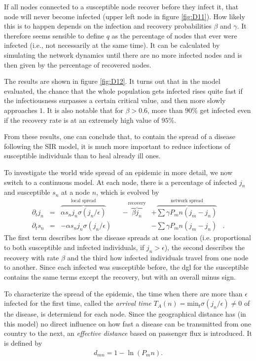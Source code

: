 \documentclass{scrartcl}
\begin{document}
If all nodes connected to a susceptible node recover before they infect it, that node will never become infected (upper left node in figure \ref{fig:D11}). How likely this is to happen depends on the infection and recovery probabilities $\beta$ and $\gamma$. 
It therefore seems sensible to define $q$ as the percentage of nodes that ever were infected (i.e., not necessarily at the same time). 
It can be calculated by simulating the network dynamics until there are no more infected nodes and is then given by the percentage of recovered nodes. 

The results are shown in figure \ref{fig:D12}. 
It turns out that in the model evaluated, the chance that the whole 
population gets infected rises quite fast if the infectiousness surpasses
a certain critical value, and then more slowly approaches $1$. It is also 
notable that for $\beta > 0.6$, more than $90\%$ get infected even if
the recovery rate is at an extremely high value of $95\%$.

From these results, one can conclude that, to contain the spread of a disease following the SIR model, 
it is much more important to reduce infections of susceptible individuals than to heal already ill ones.

To investigate the world wide spread of an epidemic in more detail, we now switch to a continuous model. At each node, there is a percentage of infected $j_n$ and susceptible $s_n$ at a node $n$, which is evolved by
\begin{align}
\partial_t j_n &=& \overbrace{\alpha s_n j_n \sigma( j_n / \epsilon)}^{\text{local spread}} &&- \overbrace{\beta j_n}^{\text{recovery}} &+ \overbrace{\sum{\gamma P_mn (j_m - j_n)}}^{\text{network spread}}&\\
\partial_t s_n &=& -\alpha s_n j_n \sigma( j_n / \epsilon)&  &&- \sum{\gamma P_mn (j_m - j_n)}&.
\end{align}
The first term describes how the disease spreads at one location (i.e. proportional to both susceptible and infected individuals, if $j_n > \epsilon$), the second describes the recovery with rate $\beta$ and the third how infected individuals travel from one node to another. Since each infected was susceptible before, the dgl for the susceptible contains the same terms except the recovery, but with an overall minus sign.

To characterize the spread of the epidemic, the time when there are more than $\epsilon$ infected for the first time, called the \emph{arrival time} $T_A(n) = \mathrm{min}_t \sigma(j_n / \epsilon) \neq 0$ of the disease, is determiend for each node. Since the geographical distance has (in this model) no direct influence on how fast a disease can be transmitted from one country to the next, an \emph{effective distance} based on passenger flux is introduced. It is defined by
\begin{align}
	d_{mn} = 1 - \ln (P_mn). \label{eq:epl}
\end{align}
\end{document}
